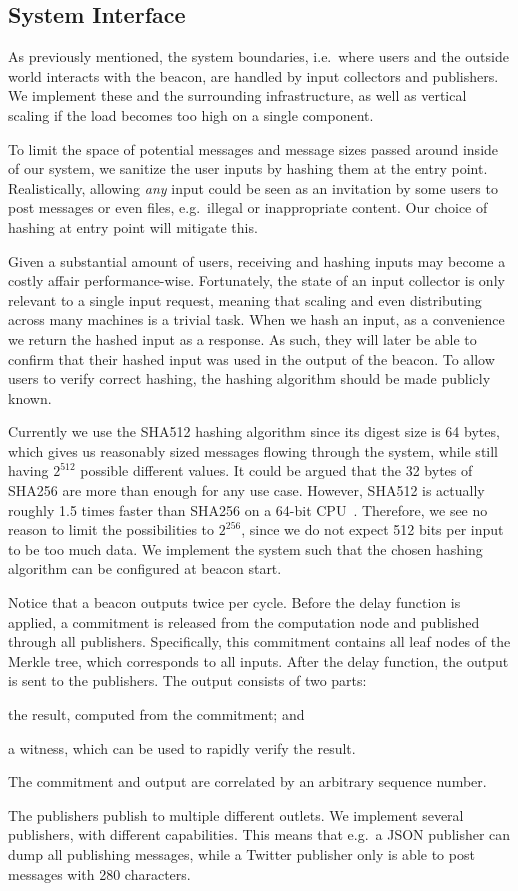 \subsection{System Interface}%
\label{sub:system_interface}
As previously mentioned, the system boundaries, i.e.\ where users and the outside world interacts with the beacon, are handled by input collectors and publishers.
We implement these and the surrounding infrastructure, as well as vertical scaling if the load becomes too high on a single component.

To limit the space of potential messages and message sizes passed around inside of our system, we sanitize the user inputs by hashing them at the entry point.
Realistically, allowing \emph{any} input could be seen as an invitation by some users to post messages or even files, e.g.\ illegal or inappropriate content.
Our choice of hashing at entry point will mitigate this.

Given a substantial amount of users, receiving and hashing inputs may become a costly affair performance-wise.
Fortunately, the state of an input collector is only relevant to a single input request, meaning that scaling and even distributing across many machines is a trivial task.
When we hash an input, as a convenience we return the hashed input as a response.
As such, they will later be able to confirm that their hashed input was used in the output of the beacon.
To allow users to verify correct hashing, the hashing algorithm should be made publicly known.

Currently we use the SHA512 hashing algorithm since its digest size is 64 bytes, which gives us reasonably sized messages flowing through the system, while still having $2^{512}$ possible different values.
It could be argued that the 32 bytes of SHA256 are more than enough for any use case.
However, SHA512 is actually roughly 1.5 times faster than SHA256 on a 64-bit CPU~\cite{sha512faster}.
Therefore, we see no reason to limit the possibilities to $2^{256}$, since we do not expect 512 bits per input to be too much data.
We implement the system such that the chosen hashing algorithm can be configured at beacon start.

Notice that a beacon outputs twice per cycle.
Before the delay function is applied, a commitment is released from the computation node and published through all publishers.
Specifically, this commitment contains all leaf nodes of the Merkle tree, which corresponds to all inputs.
After the delay function, the output is sent to the publishers.
The output consists of two parts:
\begin{eletterate*}
    \item the result, computed from the commitment; and
    \item a witness, which can be used to rapidly verify the result.
\end{eletterate*}
The commitment and output are correlated by an arbitrary sequence number.

The publishers publish to multiple different outlets.
We implement several publishers, with different capabilities.
This means that e.g.\ a JSON publisher can dump all publishing messages, while a Twitter publisher only is able to post messages with 280 characters.

